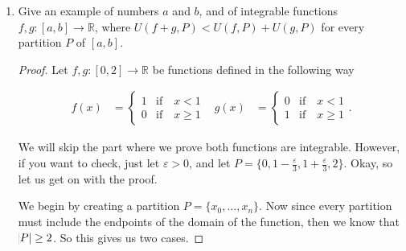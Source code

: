 \documentclass{article}
\newtheorem{theorem}{Theorem}[section]
\theoremstyle{definition}
\theoremstyle{remark}
\theoremstyle{definition}
\newtheorem*{discussion}{Discussion}
\begin{document}
\begin{enumerate}[leftmargin=*]
    \noindent Prove $s$ is integrable on $[0,2]$.
    
    \begin{discussion}
    
        As before, let us remind ourselves what it would mean for $s$ to be integrable on $[0,2]$. There are several equivalent definitions, but the one we will use is the following:
        
        \begin{theorem}
            A bounded function $f$ is integrable on $[a,b]$ if and only if, for every $\varepsilon>0$, there exists a partition $P_{\varepsilon}$ of $[a,b]$ such that
            
            \begin{equation*}
                U(f,P_{\varepsilon})-L(f,P_{\varepsilon})<\varepsilon.
            \end{equation*}
        \end{theorem}
        
        \noindent So notice that our function is in fact  
        
    \end{discussion}
    
    \begin{proof}
    
    \end{proof}
    
    \item Give an example of numbers $a$ and $b$, and of integrable functions $f,g\colon[a,b]\rightarrow\mathbb{R}$, where $U(f+g,P)<U(f,P)+U(g,P)$ for every partition $P$ of $[a,b]$.
    
    \begin{proof} Let $f,g\colon[0,2]\rightarrow\mathbb{R}$ be functions defined in the following way
    
    \begin{align*}
        f(x)&=\begin{cases} 1 & \text{if}\quad x<1 \\ 0 &\text{if}\quad x\geq 1 \end{cases} &  g(x)&=\begin{cases} 0 &\text{if}\quad x<1 \\ 1 &\text{if}\quad x\geq 1 \end{cases}.
    \end{align*}
    
    \noindent We will skip the part where we prove both functions are integrable. However, if you want to check, just let $\varepsilon>0$, and let  $P=\{0,1-\frac{\varepsilon}{3},1+\frac{\varepsilon}{3},2\}$. Okay, so let us get on with the proof.\par
    \hspace{4mm}We begin by creating a partition $P=\{x_0,\dots,x_n\}$. Now since every partition must include the endpoints of the domain of the function, then we know that $\abs{P}\geq 2$. So this gives us two cases. 
    

\end{proof}
\end{enumerate}
\end{document}
